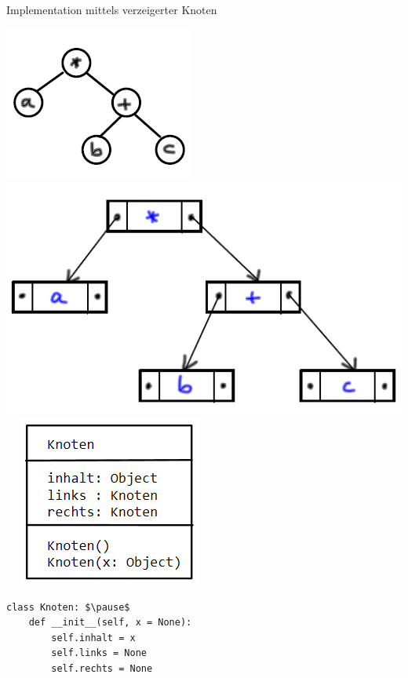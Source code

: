 \documentclass{beamer}
\begin{document}
\begin{frame}[fragile]
Implementation mittels verzeigerter Knoten 
 
\includegraphics[scale=0.5]{bild2.png} 
\includegraphics[scale=0.5]{bild4.png} ~~ 
\includegraphics[scale=0.5]{bild4a.png}  


\begin{lstlisting}[mathescape=true]
class Knoten: $\pause$
    def __init__(self, x = None):
        self.inhalt = x
        self.links = None
        self.rechts = None
\end{lstlisting} 
\end{frame}
\end{document}
